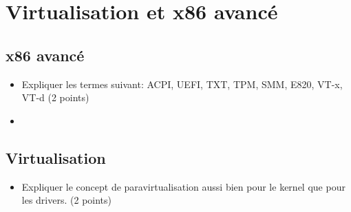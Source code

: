 %
%

\section{Virtualisation et x86 avanc\'e
         }

\subsection{x86 avanc\'e}
\begin{itemize}
  \item Expliquer les termes suivant: ACPI, UEFI, TXT, TPM, SMM, E820, VT-x, VT-d (2 points)
\end{itemize}
\begin{correction}
\begin{itemize}
  \item 
\end{itemize}
\end{correction}

\subsection{Virtualisation}
\begin{itemize}
  \item Expliquer le concept de paravirtualisation aussi bien pour
        le kernel que pour les drivers. (2 points)
\end{itemize}


